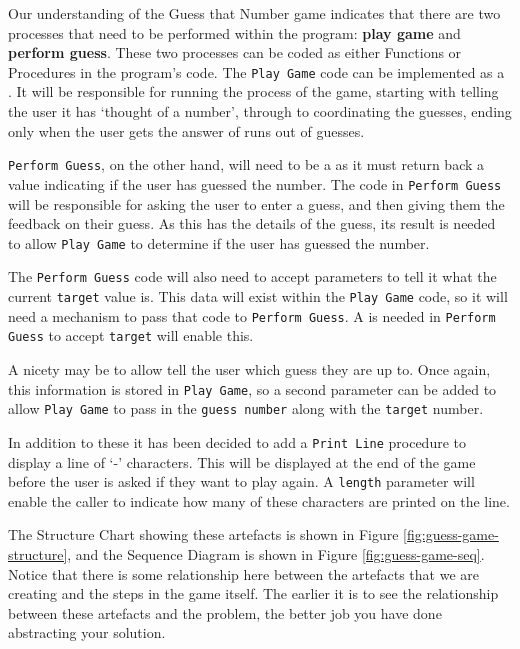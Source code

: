 Our understanding of the Guess that Number game indicates that there are two processes that need to be performed within the program: \textbf{play game} and \textbf{perform guess}. These two processes can be coded as either Functions or Procedures in the program's code. The \texttt{Play Game} code can be implemented as a . It will be responsible for running the process of the game, starting with telling the user it has `thought of a number', through to coordinating the guesses, ending only when the user gets the answer of runs out of guesses.

\texttt{Perform Guess}, on the other hand, will need to be a  as it must return back a  value indicating if the user has guessed the number. The code in \texttt{Perform Guess} will be responsible for asking the user to enter a guess, and then giving them the feedback on their guess. As this has the details of the guess, its result is needed to allow \texttt{Play Game} to determine if the user has guessed the number.

The \texttt{Perform Guess} code will also need to accept parameters to tell it what the current \texttt{target} value is. This data will exist within the \texttt{Play Game} code, so it will need a mechanism to pass that code to \texttt{Perform Guess}. A  is needed in \texttt{Perform Guess} to accept \texttt{target} will enable this. 

A nicety may be to allow tell the user which guess they are up to. Once again, this information is stored in \texttt{Play Game}, so a second parameter can be added to allow \texttt{Play Game} to pass in the \texttt{guess number} along with the \texttt{target} number.

In addition to these it has been decided to add a \texttt{Print Line} procedure to display a line of `-' characters. This will be displayed at the end of the game before the user is asked if they want to play again. A \texttt{length} parameter will enable the caller to indicate how many of these characters are printed on the line.

The Structure Chart showing these artefacts is shown in Figure \ref{fig:guess-game-structure}, and the Sequence Diagram is shown in Figure \ref{fig:guess-game-seq}. Notice that there is some relationship here between the artefacts that we are creating and the steps in the game itself. The earlier it is to see the relationship between these artefacts and the problem, the better job you have done abstracting your solution.

